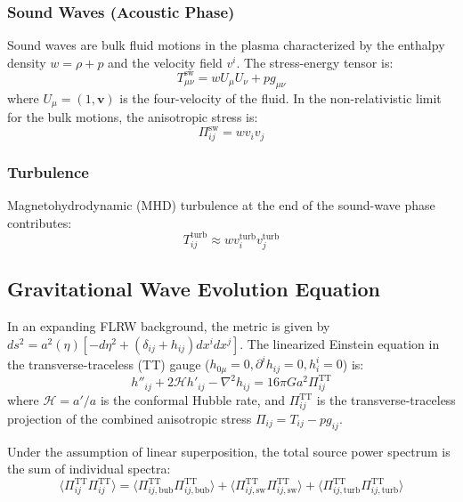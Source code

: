 \documentclass{article}
\begin{document}
\subsubsection{Sound Waves (Acoustic Phase)}
Sound waves are bulk fluid motions in the plasma characterized by the enthalpy density $w = \rho + p$ and the velocity field $v^i$. The stress-energy tensor is:
\begin{equation}
    T_{\mu\nu}^{\text{sw}} = w U_\mu U_\nu + p g_{\mu\nu}
\end{equation}
where $U_\mu = (1, \mathbf{v})$ is the four-velocity of the fluid. In the non-relativistic limit for the bulk motions, the anisotropic stress is:
\begin{equation}
    \Pi_{ij}^{\text{sw}} = w v_i v_j
\end{equation}

\subsubsection{Turbulence}
Magnetohydrodynamic (MHD) turbulence at the end of the sound-wave phase contributes:
\begin{equation}
    T_{ij}^{\text{turb}} \approx w v_i^{\text{turb}} v_j^{\text{turb}}
\end{equation}

\subsection{Gravitational Wave Evolution Equation}

In an expanding FLRW background, the metric is given by $ds^2 = a^2(\eta) [-d\eta^2 + (\delta_{ij} + h_{ij}) dx^i dx^j]$. The linearized Einstein equation in the transverse-traceless (TT) gauge ($h_{0\mu} = 0, \partial^i h_{ij} = 0, h^i_i = 0$) is:
\begin{equation}
    h''_{ij} + 2\mathcal{H} h'_{ij} - \nabla^2 h_{ij} = 16\pi G a^2 \Pi_{ij}^{\text{TT}}
\end{equation}
where $\mathcal{H} = a'/a$ is the conformal Hubble rate, and $\Pi_{ij}^{\text{TT}}$ is the transverse-traceless projection of the combined anisotropic stress $\Pi_{ij} = T_{ij} - p g_{ij}$.

Under the assumption of linear superposition, the total source power spectrum is the sum of individual spectra:
\begin{equation}
    \langle \Pi_{ij}^{\text{TT}} \Pi_{ij}^{\text{TT}} \rangle = \langle \Pi_{ij, \text{bub}}^{\text{TT}} \Pi_{ij, \text{bub}}^{\text{TT}} \rangle + \langle \Pi_{ij, \text{sw}}^{\text{TT}} \Pi_{ij, \text{sw}}^{\text{TT}} \rangle + \langle \Pi_{ij, \text{turb}}^{\text{TT}} \Pi_{ij, \text{turb}}^{\text{TT}} \rangle
\end{equation}
\end{document}
